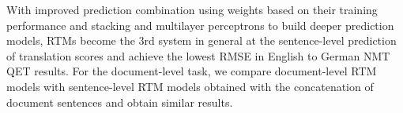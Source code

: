 With improved prediction combination using weights based on their training performance and stacking and multilayer perceptrons to build deeper prediction models, RTMs become the 3rd system in general at the sentence-level prediction of translation scores and achieve the lowest RMSE in English to German NMT QET results. For the document-level task, we compare document-level RTM models with sentence-level RTM models obtained with the concatenation of document sentences and obtain similar results.
